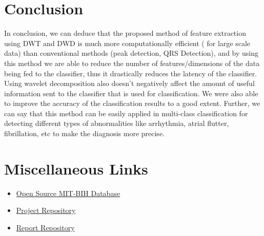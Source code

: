 \documentclass[10pt,twocolumn,letterpaper]{article}
\begin{document}
\section{Conclusion}
In conclusion, we can deduce that the proposed method of feature extraction using DWT and DWD is much more computationally efficient ( for large scale data) than conventional methods (peak detection, QRS Detection), and by using this method we are able to reduce the number of features/dimensions of the data being fed to the classifier, thus it drastically reduces the latency of the classifier.
Using wavelet decomposition also doesn’t negatively affect the amount of useful information sent to the classifier that is used for classification.
We were also able to improve the accuracy of the classification results to a good extent.
Further, we can say that this method can be easily applied in multi-class classification for detecting different types of abnormalities like arrhythmia, atrial flutter, fibrillation, etc to make the diagnosis more precise.


{\small


}


\section*{Miscellaneous Links}
\begin{itemize}
    \item \href{https://physionet.org/content/mitdb/1.0.0/}{Open Source MIT-BIH Database}
    \item \href{https://github.com/abhishekkhare1998/EcgClassificationProject}{Project Repository}
    \item \href{https://github.com/abhishekkhare1998/EcgClassWaveletPaper}{Report Repository}
\end{itemize}
\end{document}
